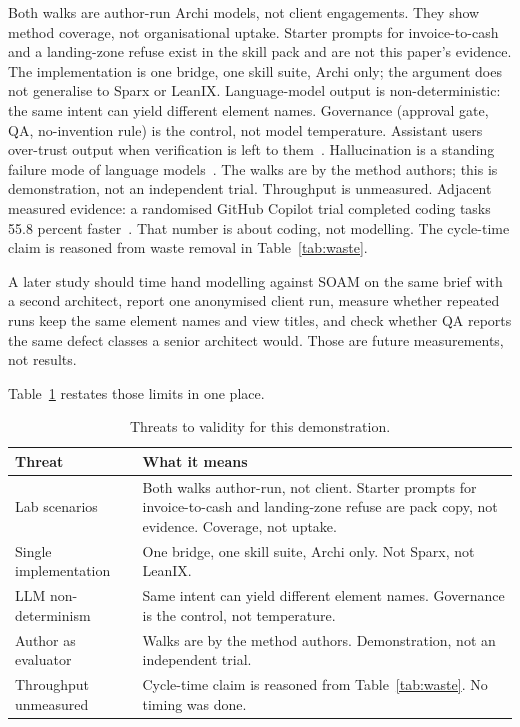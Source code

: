 \documentclass[10pt,journal,compsoc]{IEEEtran}
\begin{document}
Both walks are author-run Archi models, not client engagements. They show method coverage, not organisational uptake. Starter prompts for invoice-to-cash and a landing-zone refuse exist in the skill pack and are not this paper's evidence. The implementation is one bridge, one skill suite, Archi only; the argument does not generalise to Sparx or LeanIX. Language-model output is non-deterministic: the same intent can yield different element names. Governance (approval gate, QA, no-invention rule) is the control, not model temperature. Assistant users over-trust output when verification is left to them~\cite{perry2023}. Hallucination is a standing failure mode of language models~\cite{ji2023}. The walks are by the method authors; this is demonstration, not an independent trial. Throughput is unmeasured. Adjacent measured evidence: a randomised GitHub Copilot trial completed coding tasks 55.8 percent faster~\cite{peng2023}. That number is about coding, not modelling. The cycle-time claim is reasoned from waste removal in Table~\ref{tab:waste}.

A later study should time hand modelling against SOAM on the same brief with a second architect, report one anonymised client run, measure whether repeated runs keep the same element names and view titles, and check whether QA reports the same defect classes a senior architect would. Those are future measurements, not results.

Table~\ref{tab:threats} restates those limits in one place.

\begin{table}[!t]
\caption{Threats to validity for this demonstration.}
\label{tab:threats}
\centering
{\scriptsize
\begin{tabularx}{\columnwidth}{@{}>{\raggedright\arraybackslash}p{} X@{}}
\toprule
\textbf{Threat} & \textbf{What it means} \\
\midrule
Lab scenarios & Both walks author-run, not client. Starter prompts for invoice-to-cash and landing-zone refuse are pack copy, not evidence. Coverage, not uptake. \\
Single implementation & One bridge, one skill suite, Archi only. Not Sparx, not LeanIX. \\
LLM non-determinism & Same intent can yield different element names. Governance is the control, not temperature. \\
Author as evaluator & Walks are by the method authors. Demonstration, not an independent trial. \\
Throughput unmeasured & Cycle-time claim is reasoned from Table~\ref{tab:waste}. No timing was done. \\
\bottomrule
\end{tabularx}}
\end{table}
\end{document}
